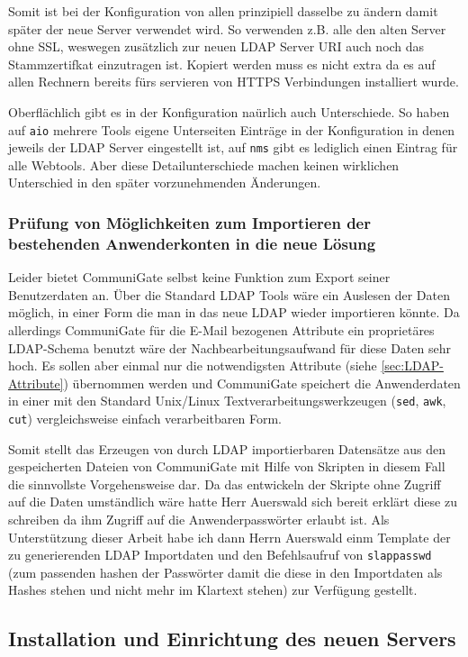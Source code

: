 \documentclass[11pt,a4paper,titlepage=firstiscover]{scrartcl} %
\begin{document}
Somit ist bei der Konfiguration von allen prinzipiell dasselbe zu ändern damit später der neue Server verwendet wird. So verwenden z.B. alle den alten Server ohne SSL, weswegen zusätzlich zur neuen LDAP Server URI auch noch das Stammzertifkat einzutragen ist. Kopiert werden muss es nicht extra da es auf allen Rechnern bereits fürs servieren von HTTPS Verbindungen installiert wurde. 

Oberflächlich gibt es in der Konfiguration naürlich auch Unterschiede. So haben auf \texttt{aio} mehrere Tools eigene Unterseiten Einträge in der Konfiguration in denen jeweils der LDAP Server eingestellt ist, auf \texttt{nms} gibt es lediglich einen Eintrag für alle Webtools. Aber diese Detailunterschiede machen keinen wirklichen Unterschied in den später vorzunehmenden Änderungen.

\subsubsection{Prüfung von Möglichkeiten zum Importieren der bestehenden Anwenderkonten in die neue Lösung}
Leider bietet CommuniGate selbst keine Funktion zum Export seiner Benutzerdaten an. Über die Standard LDAP Tools wäre ein Auslesen der Daten möglich, in einer Form die man in das neue LDAP wieder importieren könnte. Da allerdings CommuniGate für die E-Mail bezogenen Attribute ein proprietäres LDAP-Schema benutzt wäre der Nachbearbeitungsaufwand für diese Daten sehr hoch. Es sollen aber einmal nur die notwendigsten Attribute (siehe \autoref{sec:LDAP-Attribute}) übernommen werden und CommuniGate speichert die Anwenderdaten in einer mit den Standard Unix/Linux Textverarbeitungswerkzeugen (\texttt{sed}, \texttt{awk}, \texttt{cut}) vergleichsweise einfach verarbeitbaren Form. 

Somit stellt das Erzeugen von durch LDAP importierbaren Datensätze aus den gespeicherten Dateien von CommuniGate mit Hilfe von Skripten in diesem Fall die sinnvollste Vorgehensweise dar. Da das entwickeln der Skripte ohne Zugriff auf die Daten umständlich wäre hatte Herr Auerswald sich bereit erklärt diese zu schreiben da ihm Zugriff auf die Anwenderpasswörter erlaubt ist. Als Unterstützung dieser Arbeit habe ich dann Herrn Auerswald einm Template der zu generierenden LDAP Importdaten und den Befehlsaufruf von \texttt{slappasswd} (zum passenden hashen der Passwörter damit die diese in den Importdaten als Hashes stehen und nicht mehr im Klartext stehen) zur Verfügung gestellt.

\subsection{Installation und Einrichtung des neuen Servers}
\end{document}
